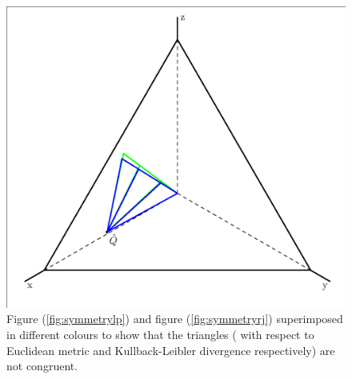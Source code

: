 \documentclass[11pt]{article}
\begin{document}
\begin{figure}[ht]
  \begin{flushright}
    \begin{minipage}[h]{.7\linewidth}
      \includegraphics[width=\textwidth]{symmetrytgr.eps}
      \caption{\footnotesize Figure (\ref{fig:symmetrylp}) and figure
        (\ref{fig:symmetryrj}) superimposed in different colours to
        show that the  triangles (
        with respect to Euclidean metric and Kullback-Leibler
        divergence respectively) are not congruent.}
      \label{fig:symmetrytgr}
    \end{minipage}
  \end{flushright}
\end{figure}
\end{document}
